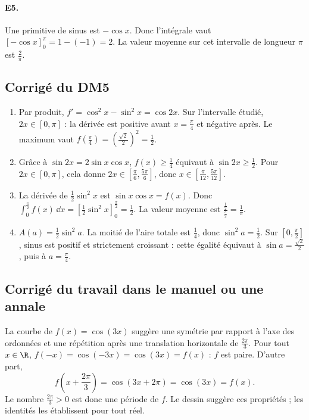 \paragraph{E5.}Une primitive de sinus est $-\cos x$. Donc l'intégrale vaut $[-\cos x]_0^\pi=1-(-1)=2$. La valeur moyenne sur cet intervalle de longueur $\pi$ est $\frac{2}{\pi}$.

\subsection{Corrigé du DM5}\begin{enumerate}
\item Par produit, $f'=\cos^2x-\sin^2x=\cos2x$. Sur l'intervalle étudié, $2x\in[0,\pi]$ : la dérivée est positive avant $x=\frac{\pi}{4}$ et négative après. Le maximum vaut $f(\frac{\pi}{4})=(\frac{\sqrt{2}}{2})^2=\frac{1}{2}$.
\item Grâce à $\sin2x=2\sin x\cos x$, $f(x)\ge\frac{1}{4}$ équivaut à $\sin 2x\ge\frac{1}{2}$. Pour $2x\in[0,\pi]$, cela donne $2x\in[\frac{\pi}{6},\frac{5\pi}{6}]$, donc $x\in[\frac{\pi}{12},\frac{5\pi}{12}]$.
\item La dérivée de $\frac12\sin^2x$ est $\sin x\cos x=f(x)$. Donc $\int_0^{\frac{\pi}{2}}f(x)\,\dd x=[\frac12\sin^2x]_0^{\frac{\pi}{2}}=\frac{1}{2}$. La valeur moyenne est $\frac{\frac{1}{2}}{\frac{\pi}{2}}=\frac{1}{\pi}$.
\item $A(a)=\frac12\sin^2a$. La moitié de l'aire totale est $\frac{1}{4}$, donc $\sin^2a=\frac{1}{2}$. Sur $[0,\frac{\pi}{2}]$, sinus est positif et strictement croissant : cette égalité équivaut à $\sin a=\frac{\sqrt{2}}{2}$, puis à $a=\frac{\pi}{4}$.
\end{enumerate}

\subsection{Corrigé du travail dans le manuel ou une annale}La courbe de $f(x)=\cos(3x)$ suggère une symétrie par rapport à l'axe des ordonnées et une répétition après une translation horizontale de $\frac{2\pi}3$. Pour tout $x\in\R$, $f(-x)=\cos(-3x)=\cos(3x)=f(x)$ : $f$ est paire. D'autre part,
\[f\left(x+\frac{2\pi}3\right)=\cos(3x+2\pi)=\cos(3x)=f(x).\]
Le nombre $\frac{2\pi}3>0$ est donc une période de $f$. Le dessin suggère ces propriétés ; les identités les établissent pour tout réel.

\fi

\backmatter
